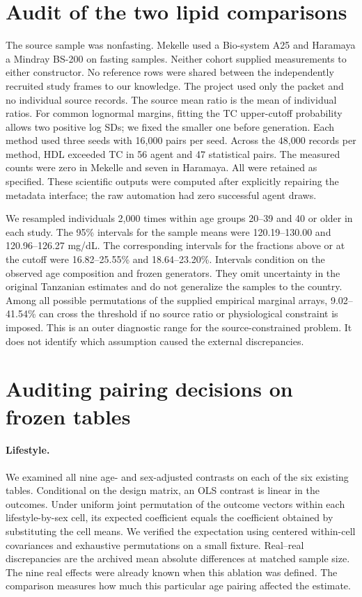 \section{Audit of the two lipid comparisons}
\label{app:nonhdl}
The source sample was nonfasting. Mekelle used a Bio-system A25 and Haramaya a Mindray BS-200 on fasting samples. Neither cohort supplied measurements to either constructor. No reference rows were shared between the independently recruited study frames to our knowledge. The project used only the packet and no individual source records. The source mean ratio is the mean of individual ratios. For common lognormal margins, fitting the TC upper-cutoff probability allows two positive log SDs; we fixed the smaller one before generation. Each method used three seeds with 16,000 pairs per seed. Across the 48,000 records per method, HDL exceeded TC in 56 agent and 47 statistical pairs. The measured counts were zero in Mekelle and seven in Haramaya. All were retained as specified. These scientific outputs were computed after explicitly repairing the metadata interface; the raw automation had zero successful agent draws.

We resampled individuals 2,000 times within age groups 20--39 and 40 or older in each study. The 95\% intervals for the sample means were 120.19--130.00 and 120.96--126.27 mg/dL. The corresponding intervals for the fractions above or at the cutoff were 16.82--25.55\% and 18.64--23.20\%. Intervals condition on the observed age composition and frozen generators. They omit uncertainty in the original Tanzanian estimates and do not generalize the samples to the country. Among all possible permutations of the supplied empirical marginal arrays, 9.02--41.54\% can cross the threshold if no source ratio or physiological constraint is imposed. This is an outer diagnostic range for the source-constrained problem. It does not identify which assumption caused the external discrepancies.

\section{Auditing pairing decisions on frozen tables}
\label{app:pairingtest}
\paragraph{Lifestyle.} We examined all nine age- and sex-adjusted contrasts on each of the six existing tables. Conditional on the design matrix, an OLS contrast is linear in the outcomes. Under uniform joint permutation of the outcome vectors within each lifestyle-by-sex cell, its expected coefficient equals the coefficient obtained by substituting the cell means. We verified the expectation using centered within-cell covariances and exhaustive permutations on a small fixture. Real--real discrepancies are the archived mean absolute differences at matched sample size. The nine real effects were already known when this ablation was defined. The comparison measures how much this particular age pairing affected the estimate.

